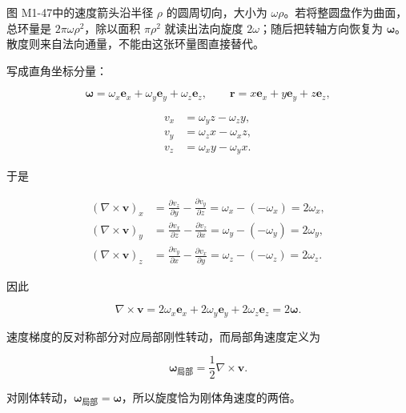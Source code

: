 图 M1-47中的速度箭头沿半径 \(\rho\) 的圆周切向，大小为
\(\omega\rho\)。若将整圆盘作为曲面，总环量是
\(2\pi\omega\rho^2\)，除以面积 \(\pi\rho^2\) 就读出法向旋度
\(2\omega\)；随后把转轴方向恢复为
\(\boldsymbol\omega\)。散度则来自法向通量，不能由这张环量图直接替代。

写成直角坐标分量：

\[
\boldsymbol\omega
=\omega_x\mathbf e_x+\omega_y\mathbf e_y+\omega_z\mathbf e_z,
\qquad
\mathbf r=x\mathbf e_x+y\mathbf e_y+z\mathbf e_z,
\]

\[
\begin{aligned}
v_x&=\omega_yz-\omega_zy,\\
v_y&=\omega_zx-\omega_xz,\\
v_z&=\omega_xy-\omega_yx.
\end{aligned}
\]

于是

\[
\begin{aligned}
(\nabla\times\mathbf v)_x
&=\frac{\partial v_z}{\partial y}
-\frac{\partial v_y}{\partial z}
=\omega_x-(-\omega_x)=2\omega_x,\\
(\nabla\times\mathbf v)_y
&=\frac{\partial v_x}{\partial z}
-\frac{\partial v_z}{\partial x}
=\omega_y-(-\omega_y)=2\omega_y,\\
(\nabla\times\mathbf v)_z
&=\frac{\partial v_y}{\partial x}
-\frac{\partial v_x}{\partial y}
=\omega_z-(-\omega_z)=2\omega_z.
\end{aligned}
\]

因此

\[
\boxed{
\nabla\times\mathbf v
=2\omega_x\mathbf e_x
+2\omega_y\mathbf e_y
+2\omega_z\mathbf e_z
=2\boldsymbol\omega
}.
\]

速度梯度的反对称部分对应局部刚性转动，而局部角速度定义为

\[
\boldsymbol\omega_{\text{局部}}
=\frac12\nabla\times\mathbf v.
\]

对刚体转动，\(\boldsymbol\omega_{\text{局部}}=\boldsymbol\omega\)，所以旋度恰为刚体角速度的两倍。

